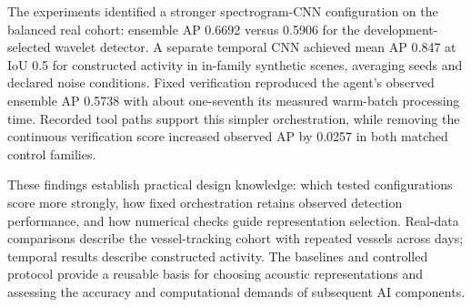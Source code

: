 \documentclass[11pt,letterpaper]{article}
\begin{document}
The experiments identified a stronger spectrogram-CNN configuration on the balanced real cohort: ensemble AP 0.6692 versus 0.5906 for the development-selected wavelet detector. A separate temporal CNN achieved mean AP 0.847 at IoU 0.5 for constructed activity in in-family synthetic scenes, averaging seeds and declared noise conditions. Fixed verification reproduced the agent's observed ensemble AP 0.5738 with about one-seventh its measured warm-batch processing time. Recorded tool paths support this simpler orchestration, while removing the continuous verification score increased observed AP by 0.0257 in both matched control families.\par

These findings establish practical design knowledge: which tested configurations score more strongly, how fixed orchestration retains observed detection performance, and how numerical checks guide representation selection. Real-data comparisons describe the vessel-tracking cohort with repeated vessels across days; temporal results describe constructed activity. The baselines and controlled protocol provide a reusable basis for choosing acoustic representations and assessing the accuracy and computational demands of subsequent AI components.\par

{\fontsize{9}{11}\selectfont





}
\end{document}
